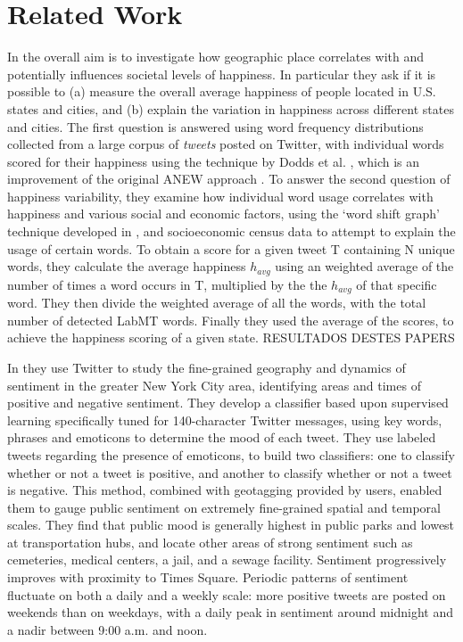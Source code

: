 \documentclass{llncs}
\begin{document}
\section{Related Work}
\label{sec:rw}

In \cite{Mitchell2013,Dodds2011,Frank2013,Bliss2012} the overall aim is to investigate how geographic place correlates with and potentially influences societal levels of happiness. In particular they ask if it is possible to (a) measure the overall average happiness of people located in U.S. states and cities, and (b) explain the variation in happiness across different states and cities. The first question is answered using word frequency distributions collected from a large corpus of \emph{tweets} posted on Twitter, with individual words scored for their happiness using the technique by Dodds et al. \cite{Dodds2009}, which is an improvement of the original ANEW approach \cite{Bradley1999}. To answer the second question of happiness variability, they examine how individual word usage correlates with happiness and various social and economic factors, using the `word shift graph' technique developed in \cite{Dodds2011,Dodds2009}, and socioeconomic census data to attempt to explain the usage of certain words. To obtain a score for a given tweet T containing N unique words, they calculate the average happiness $h_{avg}$ using an weighted average of the number of times a word occurs in T, multiplied by the the $h_{avg}$ of that specific word. They then divide the weighted average of all the words, with the total number of detected LabMT words. Finally they used the average of the scores, to achieve the happiness scoring of a given state.
RESULTADOS DESTES PAPERS


In \cite{Bertrand2013} they use Twitter to study the fine-grained geography and dynamics of sentiment in the greater New York City area, identifying areas and times of positive and negative sentiment. They develop a classifier based upon supervised learning specifically tuned for 140-character Twitter messages, using key words, phrases and emoticons to determine the mood of each tweet. They use labeled tweets regarding the presence of emoticons, to build two classifiers: one to classify whether or not a tweet is positive, and another to classify whether or not a tweet is negative. This method, combined with geotagging provided by users, enabled them to gauge public sentiment on extremely fine-grained spatial and temporal scales. They find that public mood is generally highest in public parks and lowest at transportation hubs, and locate other areas of strong sentiment such as cemeteries, medical centers, a jail, and a sewage facility. Sentiment progressively improves with proximity to Times Square. Periodic patterns of sentiment fluctuate on both a daily and a weekly scale: more positive tweets are posted on weekends than on weekdays, with a daily peak in sentiment around midnight and a nadir between 9:00 a.m. and noon.
\end{document}
